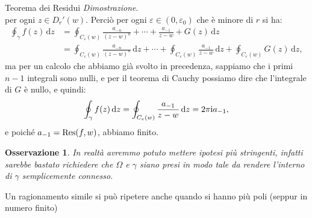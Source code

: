 \documentclass[11pt]{book}
\makeatletter
\theoremstyle{Definizione}
\theoremstyle{TeoremaProposizioneLemmaCorollarioCongettura}
\theoremstyle{OsservazioneNotaEsempio}
\newtheorem{myobs}{Osservazione}[section]
\renewenvironment{proof}[1][\proofname]{\par
  \normalfont \topsep6\p@\@plus6\p@\relax
  \trivlist
  \item[\hskip\labelsep
        \itshape
    #1\@addpunct{.}]\ignorespaces
}{%
  \endtrivlist\@endpefalse
}
\renewenvironment{proof}{\textsl{Dimostrazione}.}{}
\newcommand{\DiscPunt}[2]{D_{#1}'({#2})}
\renewcommand{\i}{\textup{i}}
\renewcommand{\d}{\mathrm{d}}
\newcommand{\dz}{\,\d z}
\newcommand{\Res}{\textup{Res}}
\makeatother
\begin{document}
\begin{boxteo}{Teorema dei Residui}
\begin{proof}
$$$$
per ogni $z\in \DiscPunt{r}{w}$. Perciò per ogni $\varepsilon\in (0,\varepsilon_0)$ che è minore di $r$ si ha:
\begin{align*}
\oint_{\gamma} f(z)\dz &= \oint_{C_\varepsilon(w)} \frac{a_{-n}}{(z-w)^n}+\cdots+\frac{a_{-1}}{z-w} + G(z)\dz \\
&= \oint_{C_\varepsilon(w)} \frac{a_{-n}}{(z-w)^n}\dz+\cdots +\oint_{C_\varepsilon(w)}\frac{a_{-1}}{z-w}\dz+\oint_{C_\varepsilon(w)} G(z)\dz,
\end{align*}
ma per un calcolo che abbiamo già svolto in precedenza, sappiamo che i primi $n-1$ integrali sono nulli, e per il teorema di Cauchy possiamo dire che l'integrale di $G$ è nullo, e quindi:
$$
\oint_\gamma f(z)\dz = \oint_{C_\varepsilon(w)} \frac{a_{-1}}{z-w}\dz = 2\pi\i a_{-1},
$$
e poiché $a_{-1} = \Res(f,w)$, abbiamo finito.
\end{proof}
\end{boxteo}
\begin{myobs}
In realtà avremmo potuto mettere ipotesi più stringenti, infatti sarebbe bastato richiedere che $\Omega$ e $\gamma$ siano presi in modo tale da rendere l'interno di $\gamma$ semplicemente connesso.
\end{myobs}
Un ragionamento simile si può ripetere anche quando si hanno più poli (seppur in numero finito)
\end{document}
